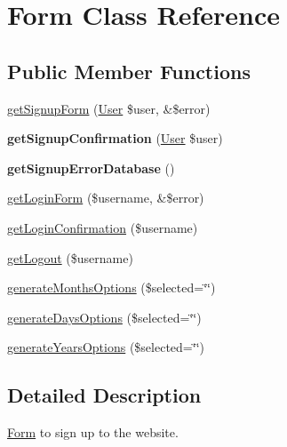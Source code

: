 \hypertarget{classForm}{\section{Form Class Reference}
\label{classForm}
}
\subsection*{Public Member Functions}
\begin{DoxyCompactItemize}
\item 
\hyperlink{classForm_a3e3459dffd7067e2e707e0a622945a66}{get\+Signup\+Form} (\hyperlink{classUser}{User} \$user, \&\$error)
\item 
\hypertarget{classForm_a6a05f450eb73a3524602817c34da17be}{{\bfseries get\+Signup\+Confirmation} (\hyperlink{classUser}{User} \$user)}\label{classForm_a6a05f450eb73a3524602817c34da17be}

\item 
\hypertarget{classForm_a11a02f548641b39c9c7c04436c95befa}{{\bfseries get\+Signup\+Error\+Database} ()}\label{classForm_a11a02f548641b39c9c7c04436c95befa}

\item 
\hyperlink{classForm_aa3ff4d216868165f1f8c442ae7ea7c95}{get\+Login\+Form} (\$username, \&\$error)
\item 
\hyperlink{classForm_a61045a8ccfd7f300a729027a70a00700}{get\+Login\+Confirmation} (\$username)
\item 
\hyperlink{classForm_a08c23069323910390d5fc8d4ede9690d}{get\+Logout} (\$username)
\item 
\hyperlink{classForm_a12b1a6bb3a44baa1b311e8cc42759f9c}{generate\+Months\+Options} (\$selected=\char`\"{}\char`\"{})
\item 
\hyperlink{classForm_ae79e7e1de18f9f611d1e405349828104}{generate\+Days\+Options} (\$selected=\char`\"{}\char`\"{})
\item 
\hyperlink{classForm_a5bcd8bfb0770d2ca9e6874b329ab7f58}{generate\+Years\+Options} (\$selected=\char`\"{}\char`\"{})
\end{DoxyCompactItemize}


\subsection{Detailed Description}
\hyperlink{classForm}{Form} to sign up to the website. 

